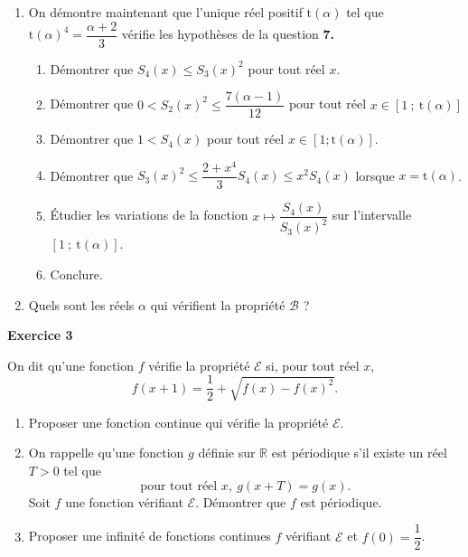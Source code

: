 \documentclass[11pt,a4paper,french]{article}
\newcommand{\R}{\mathbb{R}}
\begin{document}
\begin{enumerate}[resume]
 pour tout entier $k\geqslant 0$. On \emph{admet} pour l'instant qu'il existe un réel $\mathrm{t}(\alpha) > 1$ tel que 

\[1< S_4(x)\leqslant S_3(x)^2\leqslant \mathrm{t}(\alpha)^2S_4(x)\]

pour tout réel $x \in [1~;~\mathrm{t}(\alpha)]$.
\begin{enumerate}
\item  Soit $n \geqslant 0$ un entier tel que $1\leqslant u_{n+1}\leqslant u_n^2<\mathrm{t}(\alpha)^2u_{n+1}$ ; On pose $x_n=\sqrt{\dfrac{u_n^2}{u_{n+1}}}$. 

Démontrer que $ u_{n+k}=u_{n+1}^{2^{k-1}}S_k(x_n)  $
pour tout entier $k\geqslant 1$.
 \item Le réel  $\alpha$ vérifie-t-il la propriété $\mathcal{B}$ ?
 \end{enumerate}
\item On démontre maintenant que l'unique réel positif $\mathrm{t}(\alpha)$ tel que $\mathrm{t}(\alpha)^4 = \dfrac{\alpha+2}{3}$ vérifie les hypothèses
de la question \textbf{7.} 
\begin{enumerate}
\item  Démontrer que $S_4(x)\leqslant S_3(x)^2$ pour tout réel $x$.
\item Démontrer que $0< S_2(x)^2\leqslant\dfrac{7(\alpha-1)}{12}$ pour tout réel $x\in[1~;~\mathrm{t}(\alpha)] $
\item Démontrer que $1< S_4(x)$ pour tout réel $x\in[1;\mathrm{t}(\alpha)]$.
\item Démontrer que $S_3(x)^2\leqslant \dfrac{2+x^4}{3}S_4(x)\leqslant x^2S_4(x)$ lorsque $x =\mathrm{t}(\alpha)$.
\item Étudier les variations de la fonction $x \mapsto \dfrac{S_4(x)}{S_3(x)^2}$ sur l'intervalle $[1~;~\mathrm{t}(\alpha)]$.
\item Conclure.
\end{enumerate}
 \item Quels sont les réels $\alpha$ qui vérifient la propriété $\mathcal{B}$ ?
 
\end{enumerate}

\vspace{1cm}

\begin{center}
\textbf{Exercice 3}
\end{center}

On dit qu'une fonction $f$ vérifie la propriété $\mathcal{E}$ si, pour tout réel $x$, 
\[f(x+1)= \dfrac{1}{2}+\sqrt{f(x)-f(x)^2}.\]
\begin{enumerate}
\item  Proposer une fonction continue qui vérifie la propriété $\mathcal{E}$.
\item On rappelle qu'une fonction $g$ définie sur $\R$ est périodique s'il existe un réel $T > 0$ tel que
\[\text{pour tout réel } x,~ g(x+T) = g(x).\]
Soit $f$ une fonction vérifiant $\mathcal{E}$. Démontrer que $f$ est périodique. 
\item Proposer une infinité de fonctions continues $f$ vérifiant $\mathcal{E}$ et $f(0) =\dfrac{1}{2}$.

\end{enumerate}
\end{document}
